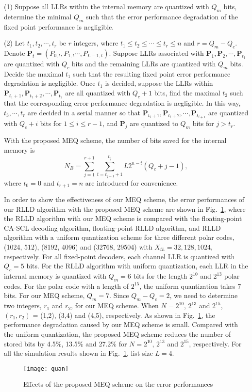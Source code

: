 \documentclass[journal]{IEEEtran}
\begin{document}
(1) Suppose all LLRs within the internal memory are quantized with $Q_m$ bits, determine the minimal $Q_m$ such that the error performance degradation of the fixed point performance is negligible.

(2) Let $t_1, t_2,\cdots,t_r$ be $r$ integers, where $t_1\leqslant t_2\leqslant \cdots \leqslant t_{r}\leqslant n$ and $r=Q_m-Q_c$. Denote $\mathbf{P}_t = (P_{0,t},P_{1,t}\cdots,P_{L-1,t})$. Suppose LLRs associated with $\mathbf{P}_1,\mathbf{P}_2,\cdots,\mathbf{P}_{t_1}$ are quantized with $Q_c$ bits and the remaining LLRs are quantized with $Q_m$ bits. Decide the maximal $t_1$ such that the resulting fixed point error performance degradation is negligible. Once $t_1$ is decided, suppose the LLRs within $\mathbf{P}_{t_1+1}, \mathbf{P}_{t_1+2},\cdots, \mathbf{P}_{t_2}$ are all quantized with $Q_c+1$ bits, find the maximal $t_2$ such that the corresponding error performance degradation is negligible. In this way, $t_3,\cdots,t_r$ are decided in a serial manner so that $\mathbf{P}_{t_i+1}, \mathbf{P}_{t_i+2},\cdots, \mathbf{P}_{t_{i+1}}$ are quantized with $Q_c+i$ bits for $1\leqslant i \leqslant r-1$, and $\mathbf{P}_j$ are quantized to $Q_m$ bits for $j> t_r$.

With the proposed MEQ scheme, the number of bits saved for the internal memory is
\begin{equation}
N_B = \sum_{j=1}^{r+1}\sum_{t=t_{j-1}+1}^{t_j}L2^{n-t}(Q_c+j-1),
\end{equation}
where $t_0= 0$ and $t_{r+1} = n$ are introduced for convenience.

In order to show the effectiveness of our MEQ scheme, the error performances of our RLLD algorithm with the proposed MEQ scheme are shown in Fig.~\ref{fig: fer_quan}, where the RLLD algorithm with our MEQ scheme is compared with the floating-point CA-SCL decoding algorithm, floating-point RLLD algorithm, and RLLD algorithm with a uniform quantization scheme for three different polar codes, (1024, 512), (8192, 4096) and (32768, 29504) with $X_{th}=32, 128, 1024$, respectively. For all fixed-point decoders, each channel LLR is quantized with $Q_c=5$ bits. For the RLLD algorithm with uniform quantization, each LLR in the internal memory is quantized with $Q_m=6$ bits for the length $2^{10}$ and $2^{13}$ polar codes. For the polar code with a length of $2^{15}$, the uniform quantization takes 7 bits. For our MEQ scheme, $Q_m=7$. Since $Q_m-Q_c =2$, we need to determine two integers, $r_1$ and $r_2$, for our MEQ scheme. When $N=2^{10}$, $2^{13}$ and $2^{15}$, $(r_1, r_2)$ = (1,2), (3,4) and (4,5), respectively. As shown in Fig.~\ref{fig: fer_quan}, the performance degradation caused by our MEQ scheme is small. Compared with the uniform quantization, the proposed MEQ scheme reduces the number of stored bits by 4.5\%, 13.5\% and 27.2\% for $N=2^{10}$, $2^{13}$ and $2^{15}$, respectively. For all the simulation results shown in Fig.~\ref{fig: fer_quan}, list size $L=4$.
\begin{figure} [hbt]
\centering
\texttt{[image: quan]}
  \caption{Effects of the proposed MEQ scheme on the error performances}\label{fig: fer_quan}
\end{figure}
\end{document}
